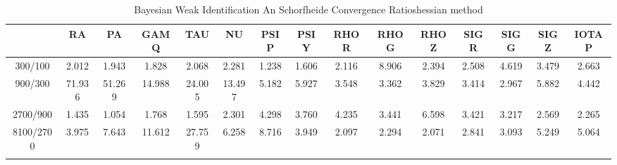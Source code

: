 \documentclass[a4paper,10pt]{article}
\begin{document}
\centering
\begin{longtable}{ccccccccccccccc}
\toprule
 & RA & PA & GAMQ & TAU & NU & PSIP & PSIY & RHOR & RHOG & RHOZ & SIGR & SIGG & SIGZ & IOTAP \\
\midrule
300/100 & 2.012 & 1.943 & 1.828 & 2.068 & 2.281 & 1.238 & 1.606 & 2.116 & 8.906 & 2.394 & 2.508 & 4.619 & 3.479 & 2.663 \\
900/300 & 71.936 & 51.269 & 14.988 & 24.005 & 13.497 & 5.182 & 5.927 & 3.548 & 3.362 & 3.829 & 3.414 & 2.967 & 5.882 & 4.442 \\
2700/900 & 1.435 & 1.054 & 1.768 & 1.595 & 2.301 & 4.298 & 3.760 & 4.235 & 3.441 & 6.598 & 3.421 & 3.217 & 2.569 & 2.265 \\
8100/2700 & 3.975 & 7.643 & 11.612 & 27.759 & 6.258 & 8.716 & 3.949 & 2.097 & 2.294 & 2.071 & 2.841 & 3.093 & 5.249 & 5.064 \\
\bottomrule
\caption{Bayesian Weak Identification An Schorfheide Convergence Ratioshessian method}
\label{table:tbl:WeakAnSchoConvergenceRatios_hessian}
\end{longtable}
\end{document}

